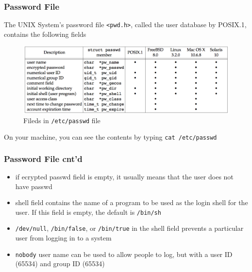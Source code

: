 \documentclass[newPxFont,sthlmFooter,nooffset]{beamer}
\begin{document}
\begin{frame}[containsverbatim,t]
  \frametitle{Password File}

The UNIX System’s password file \texttt{<pwd.h>}, called the user database by POSIX.1, contains the following fields

\begin{figure}[h]
  \centering
  \includegraphics[width=\textwidth]{figure/fig6-1_etc_passwd.png}
  \caption{Fileds in \texttt{/etc/passwd} file}
\end{figure}
\vspace{-1em}

On your machine, you can see the contents by typing \texttt{cat /etc/passwd}


\end{frame}




\begin{frame}[t]
  \frametitle{Password File cnt'd}
  \begin{itemize}
  \item if ecrypted passwd field is empty, it usually means that the user does not have passwd
  \item shell field contains the name of a program to be used as the login shell for the user. If this field is empty, the default is \texttt{/bin/sh}
  \item \texttt{/dev/null}, \texttt{/bin/false}, or \texttt{/bin/true} in the shell field prevents a particular user from logging in to a system
  \item \texttt{nobody} user name can be used to allow people to log, but with a user ID (65534) and group ID (65534)
  \end{itemize}
\end{frame}
\end{document}
